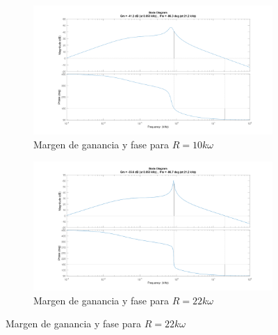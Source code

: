 \documentclass[e4_tp2_main.tex]{subfiles}
\begin{document}
\begin{figure}[H]
\begin{subfigure}[b]{0.5\textwidth}
    \includegraphics[width=\textwidth, height=\textwidth]{Imagenes/Punto1/gain_r10k.png}
    \caption{ Margen de ganancia y fase para $R=10 k\omega $}
    \label{fig:f22}
  \end{subfigure}
	\hfill
  \begin{subfigure}[H] {0.5\textwidth}
  
    \includegraphics[width=\textwidth, height=\textwidth]{Imagenes/Punto1/gain_r22k.png}
    \caption{ Margen de ganancia y fase para $R=22 k\omega$ }
      \label{fig:f13}
  \end{subfigure}

\end{figure}
\end{document}
